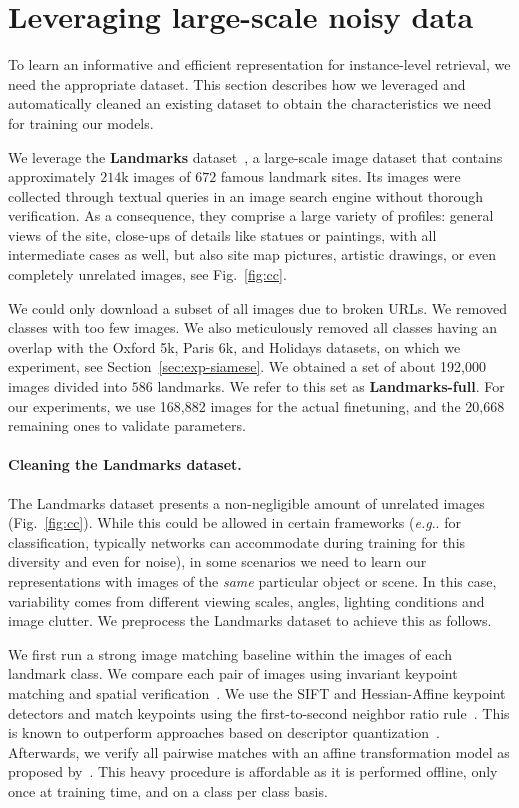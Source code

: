 \documentclass[twocolumn]{svjour3}          \smartqed  \usepackage{graphicx}
\makeatletter
\DeclareRobustCommand\onedot{\futurelet\@let@token\@onedot}
\def\@onedot{\ifx\@let@token.\else.\null\fi\xspace}
\def\eg{\emph{e.g}\onedot} \def\Eg{\emph{E.g}\onedot}
\makeatother
\begin{document}
\section{Leveraging large-scale noisy data}
\label{sec:cleaning}

To learn an informative and efficient representation for
instance-level retrieval, we need the appropriate dataset. This
section describes how we leveraged and
automatically cleaned an existing dataset to obtain the
characteristics we need for training our models.

We leverage the \textbf{Landmarks} dataset~\citep{Babenko2014}, a large-scale image dataset that contains approximately $214$k images of $672$ famous landmark sites.  Its images were collected through
textual queries in an image search engine without thorough verification.  As a consequence, they comprise a large variety of profiles: general views of the site, close-ups of details like statues
or paintings, with all intermediate cases as well, but also site map pictures, artistic drawings, or even completely unrelated images, see Fig.~\ref{fig:cc}.

We could only download a subset of all images due to broken URLs. We removed classes with too few
images. We also meticulously removed all classes having an overlap
with the Oxford 5k, Paris 6k, and Holidays datasets, on which we
experiment, see Section~\ref{sec:exp-siamese}.  We obtained a set of about
192,000 images divided into $586$ landmarks.  We refer to this set as
\textbf{Landmarks-full}.  For our experiments, we use 168,882 images
for the actual finetuning, and the 20,668 remaining ones to validate
parameters.

\paragraph{Cleaning the Landmarks dataset.} The
Landmarks dataset presents a non-negligible amount of unrelated images (Fig.~\ref{fig:cc}). While this could be allowed 
in certain frameworks (\eg for classification, typically networks can
accommodate during training for this diversity and even for noise), in
some scenarios we need to learn our representations with images of
the \emph{same} particular object or scene. In this case, variability comes
from different viewing scales, angles, lighting conditions and image
clutter. We preprocess the Landmarks dataset to achieve this as
follows.



We first run a strong image
matching baseline within the images of each landmark class.  We compare each pair of images using invariant keypoint
matching and spatial verification~\citep{Lowe2004}. We use the SIFT and Hessian-Affine keypoint detectors
\citep{Lowe2004,Mikolajczyk2004} and match keypoints using the first-to-second neighbor ratio rule~\citep{Lowe2004}. This is known
to outperform approaches based on descriptor quantization~\citep{Philbin2010}. Afterwards, we verify all pairwise matches with an
affine transformation model as proposed by~\cite{Philbin2007}. This heavy procedure is affordable as it is performed offline, only once at training time, and on a class per class basis. 
\end{document}
